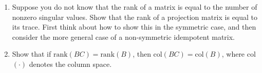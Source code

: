 \documentclass[11pt]{article}
\begin{document}
\begin{enumerate}
\item Suppose you do not know that the rank of a matrix is equal to the number of nonzero singular values.  Show that the rank of a projection matrix is equal to its trace.  First think about how to show this in the symmetric case, and then consider the more general case of a non-symmetric idempotent matrix.

\item Show that if $\text{rank}(BC) = \text{rank}(B)$, then $\text{col}(BC) = \text{col}(B)$, where col$(\cdot)$ denotes the column space.








\end{enumerate}
\end{document}
